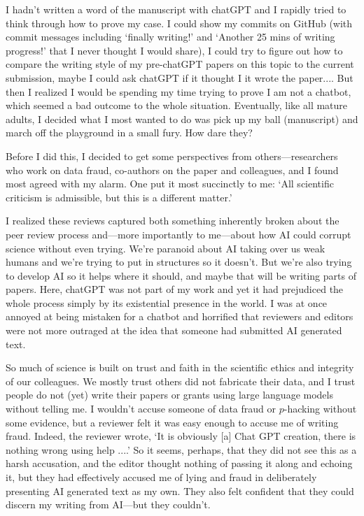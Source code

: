 \documentclass[11pt]{article}
\begin{document}
I hadn't written a word of the manuscript with chatGPT and I rapidly tried to think through how to prove my case. I could show my commits on GitHub (with commit messages including `finally writing!' and `Another 25 mins of writing progress!' that I never thought I would share), I could try to figure out how to compare the writing style of my pre-chatGPT papers on this topic to the current submission, maybe I could ask chatGPT if it thought I it wrote the paper.... But then I realized I would be spending my time trying to prove I am not a chatbot, which seemed a bad outcome to the whole situation. Eventually,  like all mature adults, I decided what I most wanted to do was pick up my ball (manuscript) and march off the playground in a small fury. How dare they? 

Before I did this, I decided to get some perspectives from others---researchers who work on data fraud, co-authors on the paper and colleagues, and I found most agreed with my alarm. One put it most succinctly to me: `All scientific criticism is admissible, but this is a different matter.' 

I realized these reviews captured both something inherently broken about the peer review process and---more importantly to me---about how AI could corrupt science without even trying. We're paranoid about AI taking over us weak humans and we're trying to put in structures so it doesn't. But we're also trying to develop AI so it helps where it should, and maybe that will be writing parts of papers. Here, chatGPT was not part of my work and yet it had prejudiced the whole process simply by its existential presence in the world. I was at once annoyed at being mistaken for a chatbot and horrified that reviewers and editors were not more outraged at the idea that someone had submitted AI generated text.

So much of science is built on trust and faith in the scientific ethics and integrity of our colleagues. We mostly trust others did not fabricate their data, and I trust people do not (yet) write their papers or grants using large language models without telling me. I wouldn't accuse someone of data fraud or $p$-hacking without some evidence, but a reviewer felt it was easy enough to accuse me of writing fraud. Indeed, the reviewer wrote, `It is obviously [a] Chat GPT creation, there is nothing wrong using help ....' So it seems, perhaps, that they did not see this as a harsh accusation, and the editor thought nothing of passing it along and echoing it, but they had effectively accused me of lying and fraud in deliberately presenting AI generated text as my own. They also felt confident that they could discern my writing from AI---but they couldn't. %
\end{document}
